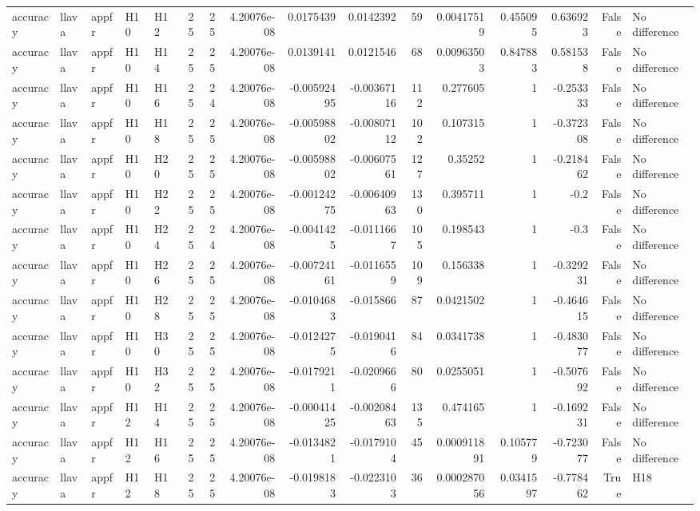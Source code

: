\begin{longtable}{lllllrrrrrrrrrrl}
accuracy & llava & appfr & H10 & H12 & 25 & 25 & 4.20076e-08 & 0.0175439 & 0.0142392 & 59 & 0.00417519 & 0.455095 & 0.636923 & False & No difference \\
accuracy & llava & appfr & H10 & H14 & 25 & 25 & 4.20076e-08 & 0.0139141 & 0.0121546 & 68 & 0.00963503 & 0.847883 & 0.581538 & False & No difference \\
accuracy & llava & appfr & H10 & H16 & 25 & 24 & 4.20076e-08 & -0.00592495 & -0.00367116 & 112 & 0.277605 & 1 & -0.253333 & False & No difference \\
accuracy & llava & appfr & H10 & H18 & 25 & 25 & 4.20076e-08 & -0.00598802 & -0.00807112 & 102 & 0.107315 & 1 & -0.372308 & False & No difference \\
accuracy & llava & appfr & H10 & H20 & 25 & 25 & 4.20076e-08 & -0.00598802 & -0.00607561 & 127 & 0.35252 & 1 & -0.218462 & False & No difference \\
accuracy & llava & appfr & H10 & H22 & 25 & 25 & 4.20076e-08 & -0.00124275 & -0.00640963 & 130 & 0.395711 & 1 & -0.2 & False & No difference \\
accuracy & llava & appfr & H10 & H24 & 25 & 24 & 4.20076e-08 & -0.0041425 & -0.0111667 & 105 & 0.198543 & 1 & -0.3 & False & No difference \\
accuracy & llava & appfr & H10 & H26 & 25 & 25 & 4.20076e-08 & -0.00724161 & -0.0116559 & 109 & 0.156338 & 1 & -0.329231 & False & No difference \\
accuracy & llava & appfr & H10 & H28 & 25 & 25 & 4.20076e-08 & -0.0104683 & -0.015866 & 87 & 0.0421502 & 1 & -0.464615 & False & No difference \\
accuracy & llava & appfr & H10 & H30 & 25 & 25 & 4.20076e-08 & -0.0124275 & -0.0190416 & 84 & 0.0341738 & 1 & -0.483077 & False & No difference \\
accuracy & llava & appfr & H10 & H32 & 25 & 25 & 4.20076e-08 & -0.0179211 & -0.0209666 & 80 & 0.0255051 & 1 & -0.507692 & False & No difference \\
accuracy & llava & appfr & H12 & H14 & 25 & 25 & 4.20076e-08 & -0.00041425 & -0.00208463 & 135 & 0.474165 & 1 & -0.169231 & False & No difference \\
accuracy & llava & appfr & H12 & H16 & 25 & 25 & 4.20076e-08 & -0.0134821 & -0.0179104 & 45 & 0.000911891 & 0.105779 & -0.723077 & False & No difference \\
accuracy & llava & appfr & H12 & H18 & 25 & 25 & 4.20076e-08 & -0.0198183 & -0.0223103 & 36 & 0.000287056 & 0.0341597 & -0.778462 & True & H18 \\

\end{longtable}
